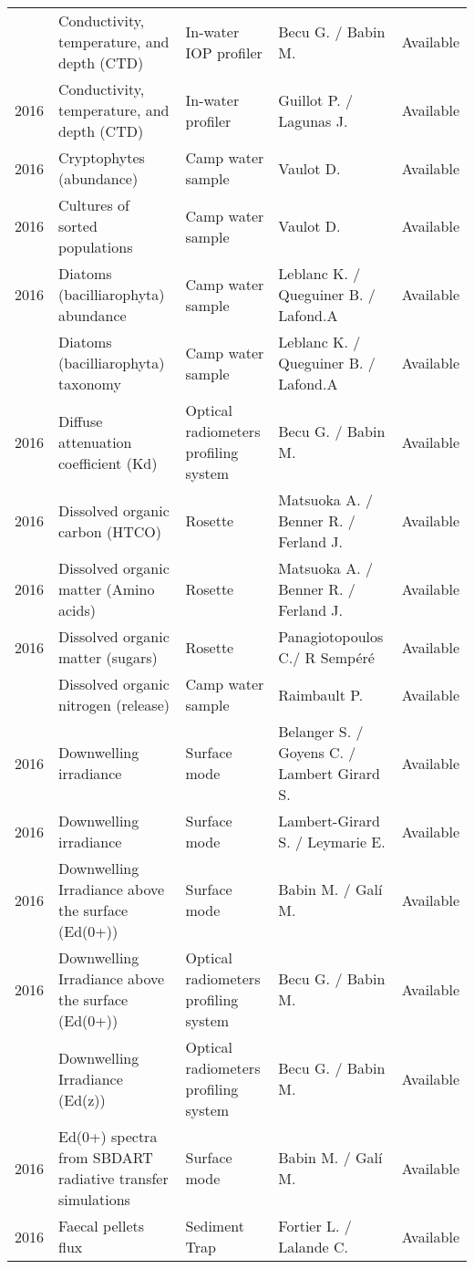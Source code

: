 \documentclass[]{article}
\begin{document}
\begin{landscape}
\begin{longtable}{rllll}
\addlinespace
2016 & Conductivity, temperature, and depth (CTD) & In-water IOP profiler & Becu G. / Babin M. & Available\\
2016 & Conductivity, temperature, and depth (CTD) & In-water profiler & Guillot P. / Lagunas J. & Available\\
2016 & Cryptophytes (abundance) & Camp water sample & Vaulot D. & Available\\
2016 & Cultures of sorted populations & Camp water sample & Vaulot D. & Available\\
2016 & Diatoms (bacilliarophyta) abundance & Camp water sample & Leblanc K. / Queguiner B. / Lafond.A & Available\\
\addlinespace
2016 & Diatoms (bacilliarophyta) taxonomy & Camp water sample & Leblanc K. / Queguiner B. / Lafond.A & Available\\
2016 & Diffuse attenuation coefficient (Kd) & Optical radiometers profiling system & Becu G. / Babin M. & Available\\
2016 & Dissolved organic carbon (HTCO) & Rosette & Matsuoka A. / Benner R. / Ferland J. & Available\\
2016 & Dissolved organic matter (Amino acids) & Rosette & Matsuoka A. / Benner R. / Ferland J. & Available\\
2016 & Dissolved organic matter (sugars) & Rosette & Panagiotopoulos C./ R Sempéré & Available\\
\addlinespace
2016 & Dissolved organic nitrogen (release) & Camp water sample & Raimbault P. & Available\\
2016 & Downwelling irradiance & Surface mode & Belanger S. / Goyens C. / Lambert Girard S. & Available\\
2016 & Downwelling irradiance & Surface mode & Lambert-Girard S. / Leymarie E. & Available\\
2016 & Downwelling Irradiance above the surface (Ed(0+)) & Surface mode & Babin M. / Galí M. & Available\\
2016 & Downwelling Irradiance above the surface (Ed(0+)) & Optical radiometers profiling system & Becu G. / Babin M. & Available\\
\addlinespace
2016 & Downwelling Irradiance (Ed(z)) & Optical radiometers profiling system & Becu G. / Babin M. & Available\\
2016 & Ed(0+) spectra from SBDART radiative transfer simulations & Surface mode & Babin M. / Galí M. & Available\\
2016 & Faecal pellets flux & Sediment Trap & Fortier L. / Lalande C. & Available\\

\end{longtable}
\end{landscape}
\end{document}
